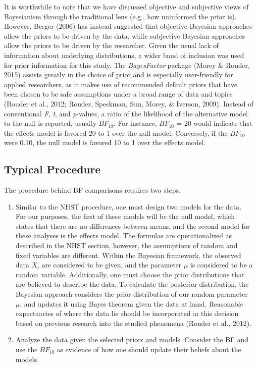 \documentclass[,man, mask]{apa6}
\theoremstyle{definition}
\theoremstyle{definition}
\theoremstyle{definition}
\theoremstyle{remark}
\begin{document}
It is worthwhile to note that we have discussed objective and subjective
views of Bayesianism through the traditional lens (e.g., how uninformed
the prior is). However, Berger (2006) has instead suggested that
objective Bayesian approaches allow the priors to be driven by the data,
while subjective Bayesian approaches allow the priors to be driven by
the researcher. Given the usual lack of information about underlying
distributions, a wider band of inclusion was used for prior information
for this study. The \emph{BayesFactor} package (Morey \& Rouder, 2015)
assists greatly in the choice of prior and is especially user-friendly
for applied researchers, as it makes use of recommended default priors
that have been chosen to be safe assumptions under a broad range of data
and topics (Rouder et al., 2012; Rouder, Speckman, Sun, Morey, \&
Iverson, 2009). Instead of conventional \emph{F}, \emph{t}, and
\emph{p}-values, a ratio of the likelihood of the alternative model to
the null is reported, usually \(BF_{10}\). For instance, \(BF_{10}\) =
20 would indicate that the effects model is favored 20 to 1 over the
null model. Conversely, if the \(BF_{10}\) were 0.10, the null model is
favored 10 to 1 over the effects model.

\subsection{Typical Procedure}\label{typical-procedure-1}

The procedure behind BF comparisons requires two steps.

\begin{enumerate}
\def\labelenumi{\arabic{enumi})}
\item
  Similar to the NHST procedure, one must design two models for the
  data. For our purposes, the first of these models will be the null
  model, which states that there are no differences between means, and
  the second model for these analyses is the effects model. The formulas
  are operationalized as described in the NHST section, however, the
  assumptions of random and fixed variables are different. Within the
  Bayesian framework, the observed data \(X_{i}\) are considered to be
  given, and the parameter \(\mu\) is considered to be a random
  variable. Additionally, one must choose the prior distributions that
  are believed to describe the data. To calculate the posterior
  distribution, the Bayesian approach considers the prior distribution
  of our random parameter \(\mu\), and updates it using Bayes theorem
  given the data at hand. Reasonable expectancies of where the data lie
  should be incorporated in this decision based on previous research
  into the studied phenomena (Rouder et al., 2012).
\item
  Analyze the data given the selected priors and models. Consider the BF
  and use the \(BF_{10}\) as evidence of how one should update their
  beliefs about the models.
\end{enumerate}
\end{document}
